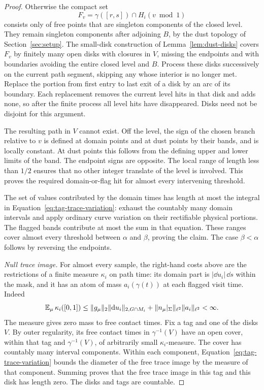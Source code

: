\begin{proof}
Otherwise the compact set
\[
 F_v=\gamma([r,s])\cap H_i(v\bmod1)
\]
consists only of free points that are singleton components of the
closed level.  They remain singleton components after adjoining $B$,
by the dust topology of Section~\ref{sec:setup}.  The small-disk
construction of Lemma~\ref{lem:dust-disks} covers $F_v$ by finitely
many open disks with closures in $V$, missing the endpoints and with
boundaries avoiding the entire closed level and $B$.  Process these
disks successively on the current path segment, skipping any whose
interior is no longer met.  Replace the portion from first entry to
last exit of a disk by an arc of its boundary.  Each replacement
removes the current level hits in that disk and adds none, so after
the finite process all level hits have disappeared.  Disks need not
be disjoint for this argument.

The resulting path in $V$ cannot exist.  Off the level, the sign of
the chosen branch relative to $v$ is defined at domain points and at
dust points by their bands, and is locally constant.  At dust points
this follows from the defining upper and lower limits of the band.
The endpoint signs are opposite.  The local range of length less
than $1/2$ ensures that no other integer translate of the level is
involved.  This proves the required domain-or-flag hit for almost
every intervening threshold.

The set of values contributed by the domain times has length at most
the integral in Equation~\eqref{eq:tag-trace-variation}: exhaust the
countably many domain intervals and apply ordinary curve variation
on their rectifiable physical portions.  The flagged bands contribute
at most the sum in that equation.  These ranges cover almost every
threshold between $\alpha$ and $\beta$, proving the claim.  The case
$\beta<\alpha$ follows by reversing the endpoints.

\emph{Null trace image.}
For almost every sample, the right-hand costs above are the
restrictions of a finite measure $\kappa_i$ on path time: its domain
part is $|\dd u_i|\,\dd s$ within the mask, and it has an atom of mass
$a_i(\gamma(t))$ at each flagged visit time.  Indeed
\[
 \operatorname{\mathbb E}_\mu\kappa_i([0,1])
 \le \|g_\mu\|_2\|\mathrm d u_i\|_{2,G\cap M_i}
      +\|n_\mu|_\Sigma\|_{\ell^2}\|a_i\|_{\ell^2}<\infty.
\]
The measure gives zero mass to free contact times.  Fix a tag and one
of the disks $V$.  By outer regularity, its free contact times in
$\gamma^{-1}(V)$ have an open cover, within that tag and
$\gamma^{-1}(V)$, of arbitrarily small $\kappa_i$-measure.  The cover
has countably many interval components.  Within each component,
Equation~\eqref{eq:tag-trace-variation} bounds the diameter of the
free trace image by the measure of that component.  Summing proves
that the free trace image in this tag and this disk has length zero.
The disks and tags are countable.


\end{proof}
